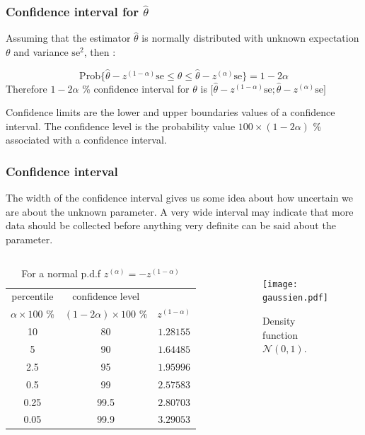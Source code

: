 \frame
{
\frametitle{Confidence interval for $\hat{\theta}$}


\begin{definition}

Assuming that the estimator $\hat{\theta}$ is normally distributed with unknown expectation $\theta$ and variance $\mathrm{se}^2$, then :

$$
\mathrm{Prob}\lbrace \hat{\theta}-z^{(1-\alpha)} \mathrm{se}\leq  \theta \leq \hat{\theta}- z^{(\alpha)} \mathrm{se}\rbrace=1-2\alpha
$$
Therefore   $1-2\alpha$ \% \alert{confidence interval} for $\theta$ is
$
\lbrack \hat{\theta}-z^{(1-\alpha)}\mathrm{se} ; \hat{\theta}- z^{(\alpha)} \mathrm{se}\rbrack
$

\alert{Confidence limits} are the lower and upper boundaries  values of a confidence interval. The \alert{confidence level} is the probability value $100 \times (1-2\alpha)$ \% associated with a confidence interval.

\end{definition}


}
\frame
{
\frametitle{Confidence interval}

The width of the confidence interval gives us some idea about how uncertain we are about the unknown parameter. A very wide interval may indicate that more data should be collected before anything very definite can be said about the parameter.

\begin{columns}
\begin{table}[!h]
\begin{tabular}{|c|c|c|}
\hline
\tiny{percentile} &\tiny{confidence level}& \\
$\alpha\times 100$ \% & $(1-2\alpha)\times 100$  \% & $z^{(1-\alpha)}$\\
\hline
10 &80 & $1.28155 $ \\	
5 & 90 &	$1.64485$ \\
2.5 & 95 	& $1.95996 $ \\
0.5 & 99 	& $2.57583 $ \\
0.25 &99.5 	& $2.80703 $ \\
0.05 &99.9 	& $3.29053 $ \\
\hline
\end{tabular}
\caption{\tiny{For a normal p.d.f $z^{(\alpha)}=-z^{(1-\alpha)}$}}
\end{table}
\begin{figure}[!h]
\texttt{[image: gaussien.pdf]}
\caption{ \tiny{Density function $\mathcal{N}(0,1)$.}}
\end{figure}
\end{columns}
}
